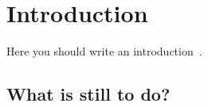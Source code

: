 \chapter{Introduction}

Here you should write an introduction~\cite{source}.

\section{What is still to do?}

